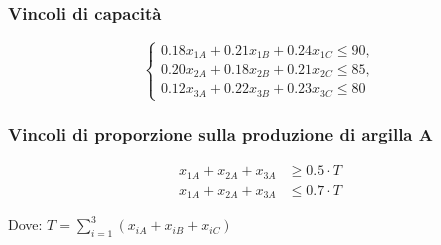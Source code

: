 \subsubsection{Vincoli di capacità}
\[
\begin{cases}
    0.18x_{1A}+0.21x_{1B}+0.24x_{1C} \leq 90, \\
    0.20x_{2A}+0.18x_{2B}+0.21x_{2C} \leq 85, \\
    0.12x_{3A}+0.22x_{3B}+0.23x_{3C} \leq 80
\end{cases}
\]

\subsubsection{Vincoli di proporzione sulla produzione di argilla A}
\begin{align}
x_{1A}+x_{2A}+x_{3A} &\geq 0.5 \cdot T \\
x_{1A}+x_{2A}+x_{3A} &\leq 0.7 \cdot T
\end{align}

Dove: $T = \sum_{i=1}^{3}(x_{iA}+x_{iB}+x_{iC})$